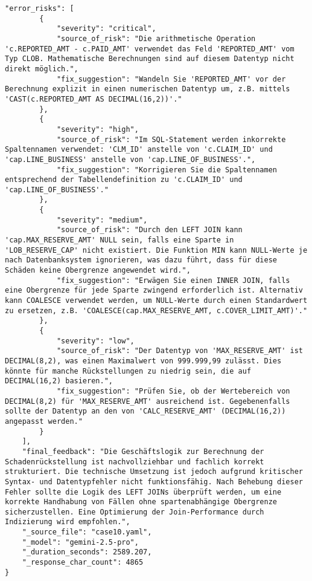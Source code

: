 \begin{lstlisting}[caption={Ausgabe: GEMINI 2.5 Pro Anwendungsfall 10 Robustheitsdurchlauf},label={gemini_case10_prompt3}]
    "error_risks": [
        {
            "severity": "critical",
            "source_of_risk": "Die arithmetische Operation 'c.REPORTED_AMT - c.PAID_AMT' verwendet das Feld 'REPORTED_AMT' vom Typ CLOB. Mathematische Berechnungen sind auf diesem Datentyp nicht direkt möglich.",
            "fix_suggestion": "Wandeln Sie 'REPORTED_AMT' vor der Berechnung explizit in einen numerischen Datentyp um, z.B. mittels 'CAST(c.REPORTED_AMT AS DECIMAL(16,2))'."
        },
        {
            "severity": "high",
            "source_of_risk": "Im SQL-Statement werden inkorrekte Spaltennamen verwendet: 'CLM_ID' anstelle von 'c.CLAIM_ID' und 'cap.LINE_BUSINESS' anstelle von 'cap.LINE_OF_BUSINESS'.",
            "fix_suggestion": "Korrigieren Sie die Spaltennamen entsprechend der Tabellendefinition zu 'c.CLAIM_ID' und 'cap.LINE_OF_BUSINESS'."
        },
        {
            "severity": "medium",
            "source_of_risk": "Durch den LEFT JOIN kann 'cap.MAX_RESERVE_AMT' NULL sein, falls eine Sparte in 'LOB_RESERVE_CAP' nicht existiert. Die Funktion MIN kann NULL-Werte je nach Datenbanksystem ignorieren, was dazu führt, dass für diese Schäden keine Obergrenze angewendet wird.",
            "fix_suggestion": "Erwägen Sie einen INNER JOIN, falls eine Obergrenze für jede Sparte zwingend erforderlich ist. Alternativ kann COALESCE verwendet werden, um NULL-Werte durch einen Standardwert zu ersetzen, z.B. 'COALESCE(cap.MAX_RESERVE_AMT, c.COVER_LIMIT_AMT)'."
        },
        {
            "severity": "low",
            "source_of_risk": "Der Datentyp von 'MAX_RESERVE_AMT' ist DECIMAL(8,2), was einen Maximalwert von 999.999,99 zulässt. Dies könnte für manche Rückstellungen zu niedrig sein, die auf DECIMAL(16,2) basieren.",
            "fix_suggestion": "Prüfen Sie, ob der Wertebereich von DECIMAL(8,2) für 'MAX_RESERVE_AMT' ausreichend ist. Gegebenenfalls sollte der Datentyp an den von 'CALC_RESERVE_AMT' (DECIMAL(16,2)) angepasst werden."
        }
    ],
    "final_feedback": "Die Geschäftslogik zur Berechnung der Schadenrückstellung ist nachvollziehbar und fachlich korrekt strukturiert. Die technische Umsetzung ist jedoch aufgrund kritischer Syntax- und Datentypfehler nicht funktionsfähig. Nach Behebung dieser Fehler sollte die Logik des LEFT JOINs überprüft werden, um eine korrekte Handhabung von Fällen ohne spartenabhängige Obergrenze sicherzustellen. Eine Optimierung der Join-Performance durch Indizierung wird empfohlen.",
    "_source_file": "case10.yaml",
    "_model": "gemini-2.5-pro",
    "_duration_seconds": 2589.207,
    "_response_char_count": 4865
}
\end{lstlisting}

